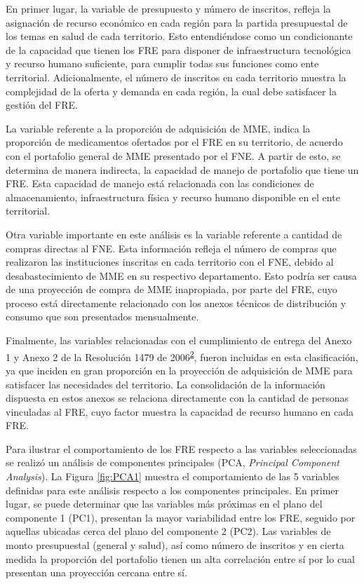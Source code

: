 \documentclass[
]{book}
\begin{document}
En primer lugar, la variable de presupuesto y número de inscritos, refleja la asignación de recurso económico en cada región para la partida presupuestal de los temas en salud de cada territorio. Esto entendiéndose como un condicionante de la capacidad que tienen los FRE para disponer de infraestructura tecnológica y recurso humano suficiente, para cumplir todas sus funciones como ente territorial. Adicionalmente, el número de inscritos en cada territorio muestra la complejidad de la oferta y demanda en cada región, la cual debe satisfacer la gestión del FRE.

La variable referente a la proporción de adquisición de MME, indica la proporción de medicamentos ofertados por el FRE en su territorio, de acuerdo con el portafolio general de MME presentado por el FNE. A partir de esto, se determina de manera indirecta, la capacidad de manejo de portafolio que tiene un FRE. Esta capacidad de manejo está relacionada con las condiciones de almacenamiento, infraestructura física y recurso humano disponible en el ente territorial.

Otra variable importante en este análisis es la variable referente a cantidad de compras directas al FNE. Esta información refleja el número de compras que realizaron las instituciones inscritas en cada territorio con el FNE, debido al desabastecimiento de MME en su respectivo departamento. Esto podría ser causa de una proyección de compra de MME inapropiada, por parte del FRE, cuyo proceso está directamente relacionado con los anexos técnicos de distribución y consumo que son presentados mensualmente.

Finalmente, las variables relacionadas con el cumplimiento de entrega del Anexo 1 y Anexo 2 de la Resolución 1479 de 2006\textsuperscript{\protect\hyperlink{ref-MSPS1479-2006}{2}}, fueron incluidas en esta clasificación, ya que inciden en gran proporción en la proyección de adquisición de MME para satisfacer las necesidades del territorio. La consolidación de la información dispuesta en estos anexos se relaciona directamente con la cantidad de personas vinculadas al FRE, cuyo factor muestra la capacidad de recurso humano en cada FRE.

Para ilustrar el comportamiento de los FRE respecto a las variables seleccionadas se realizó un análisis de componentes principales (PCA, \emph{Principal Component Analysis}). La Figura \ref{fig:PCA1} muestra el comportamiento de las 5 variables definidas para este análisis respecto a los componentes principales. En primer lugar, se puede determinar que las variables más próximas en el plano del componente 1 (PC1), presentan la mayor variabilidad entre los FRE, seguido por aquellas ubicadas cerca del plano del componente 2 (PC2). Las variables de monto presupuestal (general y salud), así como número de inscritos y en cierta medida la proporción del portafolio tienen un alta correlación entre sí por lo cual presentan una proyección cercana entre sí.
\end{document}

